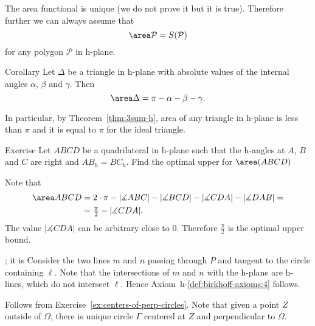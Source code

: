 The area functional is unique (we do not prove it but it is true).
Therefore further we can always assume that
$$\area\mathcal{P}= S(\mathcal{P})$$
for any polygon $\mathcal{P}$ in h-plane.


\begin{thm}{Corollary}\label{cor:area-h-trig}
Let $\Delta$ be a triangle in h-plane with absolute values of the internal angles $\alpha$, $\beta$ and $\gamma$.
Then 
$$\area\Delta=\pi-\alpha-\beta-\gamma.$$

In particular, by Theorem~\ref{thm:3sum-h},
area of any triangle in h-plane is less than $\pi$ and it is equal to $\pi$ for the ideal triangle.
\end{thm}

\begin{thm}{Exercise}\label{ex:area-sup}
Let $ABCD$ be a quadrilateral in h-plane such that the h-angles at $A$, $B$ and $C$ are right and $AB_h=BC_h$.
 Find the optimal upper for $\area(ABCD)$
\end{thm}

















Note that 
\begin{align*}
\area ABCD
&=
2\cdot\pi-|\measuredangle ABC|-|\measuredangle BCD|-|\measuredangle CDA|-|\measuredangle DAB|=
\\
&=\tfrac{\pi}2-|\measuredangle CDA|.
\end{align*}
The value $|\measuredangle CDA|$ can be arbitrary close to $0$.
Therefore $\tfrac{\pi}2$ is the optimal upper bound.









;
it is
Consider the two lines $m$ and $n$ passing through $P$ and tangent to the circle containing $\ell$.
Note that the intersections of $m$ and $n$ with the h-plane are h-lines, which do not intersect $\ell$.
Hence Axiom~h-$\!$\ref{def:birkhoff-axioms:4} follows.










Follows from Exercise~\ref{ex:centers-of-perp-circles}.
Note that given a point $Z$ outside of $\Omega$,
there is unique circle $\Gamma$ centered at $Z$ and perpendicular to $\Omega$.

